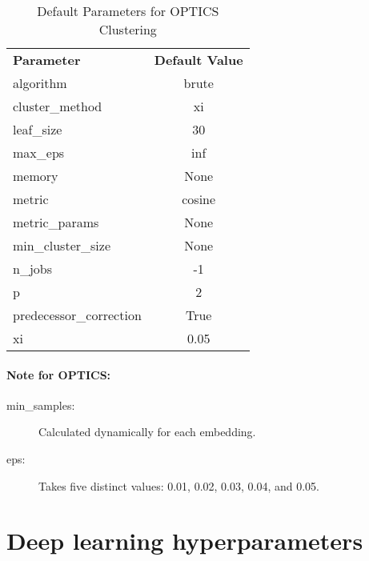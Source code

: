     \begin{table}[ht]
        \centering
        \caption{Default Parameters for OPTICS Clustering}
        \begin{tabular}{lc}
            \textbf{Parameter} & \textbf{Default Value} \\
            algorithm & brute \\
            cluster\_method & xi \\
            leaf\_size & 30 \\
            max\_eps & inf \\
            memory & None \\
            metric & cosine \\
            metric\_params & None \\
            min\_cluster\_size & None \\
            n\_jobs & -1 \\
            p & 2 \\
            predecessor\_correction & True \\
            xi & 0.05 \\
        \end{tabular}
    \end{table}


    \paragraph{Note for OPTICS:}
    \begin{description}
        \item[min\_samples:] Calculated dynamically for each embedding.
        \item[eps:] Takes five distinct values: 0.01, 0.02, 0.03, 0.04, and 0.05.
    \end{description}

\section{Deep learning hyperparameters}
